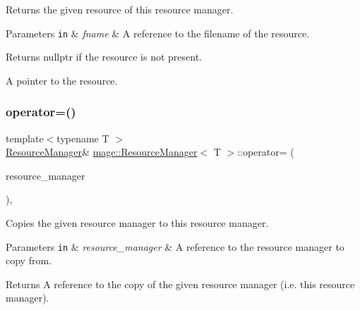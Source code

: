 Returns the given resource of this resource manager.


\begin{DoxyParams}[1]{Parameters}
\mbox{\tt in}  & {\em fname} & A reference to the filename of the resource. \\
\hline
\end{DoxyParams}
\begin{DoxyReturn}{Returns}
{\ttfamily nullptr} if the resource is not present. 

A pointer to the resource. 
\end{DoxyReturn}
\hypertarget{classmage_1_1_resource_manager_a5cc1867dbb196671fb53763c98aee1dd}{}\label{classmage_1_1_resource_manager_a5cc1867dbb196671fb53763c98aee1dd} 
\subsubsection{\texorpdfstring{operator=()}{operator=()}}
{\footnotesize\ttfamily template$<$typename T $>$ \\
\hyperlink{classmage_1_1_resource_manager}{Resource\+Manager}\& \hyperlink{classmage_1_1_resource_manager}{mage\+::\+Resource\+Manager}$<$ T $>$\+::operator= (\begin{DoxyParamCaption}\item[{const \hyperlink{classmage_1_1_resource_manager}{Resource\+Manager}$<$ T $>$ \&}]{resource\+\_\+manager }\end{DoxyParamCaption})\hspace{0.3cm}{\ttfamily [private]}, {\ttfamily [delete]}}

Copies the given resource manager to this resource manager.


\begin{DoxyParams}[1]{Parameters}
\mbox{\tt in}  & {\em resource\+\_\+manager} & A reference to the resource manager to copy from. \\
\hline
\end{DoxyParams}
\begin{DoxyReturn}{Returns}
A reference to the copy of the given resource manager (i.\+e. this resource manager). 
\end{DoxyReturn}
\hypertarget{classmage_1_1_resource_manager_a25b8838bb73dfbc2c6589fae7da0099e}{}\label{classmage_1_1_resource_manager_a25b8838bb73dfbc2c6589fae7da0099e} 
